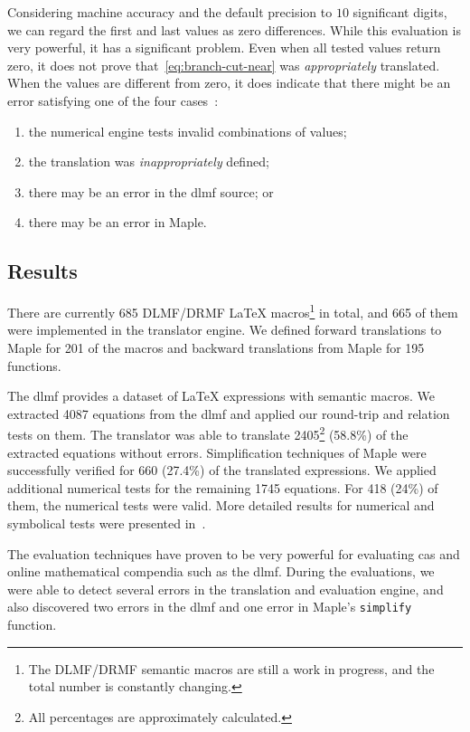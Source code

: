 \documentclass[a4paper,11pt]{article}
\newcommand{\DLMF}{DLMF}
\newcommand{\DRMF}{DRMF}
\newcommand{\Maple}{Maple}
\newcommand{\Macro}{\DLMF/\DRMF{} \LaTeX{} macro}
\theoremstyle{defTheoStyle}
\theoremstyle{defExampStyle}
\begin{document}
	Considering machine accuracy and the default precision to $10$ significant digits, we can regard the first and last values as zero differences. While this evaluation is very powerful, it has a significant problem. Even when all tested values return zero, it does not prove that~\eqref{eq:branch-cut-near} was {\it appropriately} translated. When the values are different from zero, it does indicate that there might be an error satisfying one of the four cases~\parencite{NumericalTests:Paper}:
	\begin{enumerate}
		\item the numerical engine tests invalid combinations of values;
		\item the translation was {\it inappropriately} defined;
		\item there may be an error in the \gls*{dlmf} source; or
		\item there may be an error in \Maple.
	\end{enumerate}
	
	\subsection{Results}\label{sec:test-summary}
	There are currently 685 \Macro{}s\footnote{The DLMF/DRMF semantic macros are still a work in progress, and the total number is constantly changing.} in total, and 665 of them were implemented in the translator engine. We defined forward translations to \Maple{} for 201 of the macros and backward translations from \Maple{} for 195 functions. 
	
	The \gls*{dlmf} provides a dataset of \LaTeX{} expressions with semantic macros. We extracted 4087 equations from the \gls*{dlmf} and applied our round-trip and relation tests on them. The translator was able to translate 2405\footnote{All percentages are approximately calculated.} (58.8\%) of the extracted equations without errors. 
	Simplification techniques of \Maple{} were successfully verified for 660 (27.4\%) of the translated expressions. 
	We applied additional numerical tests for the remaining 1745 equations. For 418 (24\%) of them, the numerical tests were valid. More detailed results for numerical and symbolical tests were presented in~\parencite{NumericalTests:Paper}.
	
	
	The evaluation techniques have proven to be very powerful for evaluating \gls*{cas} and online mathematical compendia such as the \gls*{dlmf}. During the evaluations, we were able to detect several errors in the translation and evaluation engine, and also discovered two errors in the \gls*{dlmf} and one error in \Maple's \texttt{simplify} function.
	
\end{document}
